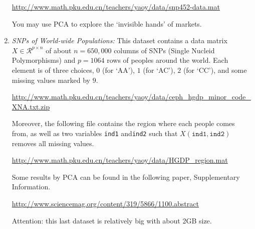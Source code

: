 \documentclass[11pt]{article}
\def\R{{\mathcal R}}
\begin{document}
\begin{enumerate}
\url{http://www.math.pku.edu.cn/teachers/yaoy/data/snp452-data.mat}

You may use PCA to explore the `invisible hands' of markets.

\item {\em SNPs of World-wide Populations:} This dataset contains a data matrix $X\in \R^{p\times n}$ of about $n=650,000$ columns of SNPs (Single Nucleid Polymorphisms) and $p=1064$ rows of peoples around the world. Each element is of three choices, $0$ (for `AA'), $1$ (for `AC'), $2$ (for `CC'), and some missing values marked by $9$. 

\url{http://www.math.pku.edu.cn/teachers/yaoy/data/ceph_hgdp_minor_code_XNA.txt.zip}

Moreover, the following file contains the region where each people comes from, as well as two variables {\texttt{ind1}} and{\texttt{ind2}} such that $X({\texttt{ind1}},{\texttt{ind2}})$ removes all missing values. 

\url{http://www.math.pku.edu.cn/teachers/yaoy/data/HGDP_region.mat}

Some results by PCA can be found in the following paper, Supplementary Information. 

\url{http://www.sciencemag.org/content/319/5866/1100.abstract}

Attention: this last dataset is relatively big with about 2GB size. 

\end{enumerate}
\end{document}
